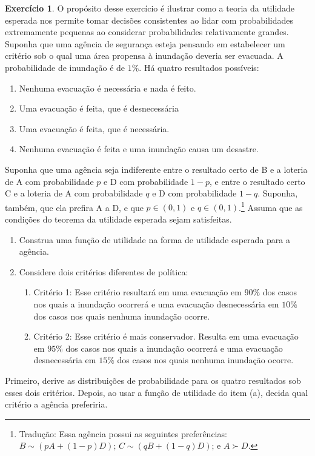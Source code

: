 \documentclass[12pt]{article}
\numberwithin{equation}{section}
\theoremstyle{plain}
\theoremstyle{definition}
\newtheorem{exercise}{Exercício}
\theoremstyle{remark}
\begin{document}
\begin{exercise}
  \parencite[exercício 6.B.4]{Mas-Colell1995} O propósito desse exercício é ilustrar como a teoria da utilidade esperada nos permite tomar decisões consistentes ao lidar com probabilidades extremamente pequenas ao considerar probabilidades relativamente grandes. Suponha que uma agência de segurança esteja pensando em estabelecer um critério sob o qual uma área propensa à inundação deveria ser evacuada. A probabilidade de inundação é de \(1\%\). Há quatro resultados possíveis:
  
  \begin{enumerate}
\def\labelenumi{(\Alph{enumi})}
\item
Nenhuma evacuação é necessária e nada é feito.
\item
Uma evacuação é feita, que é desnecessária
\item
Uma evacuação é feita, que é necessária.
\item
  Nenhuma evacuação é feita e uma inundação causa um desastre.
\end{enumerate}

Suponha que uma agência seja indiferente entre o resultado certo de B e a loteria de A com probabilidade \(p\) e D com probabilidade \(1-p\), e entre o resultado certo C e a loteria de A com probabilidade \(q\) e D com probabilidade \(1-q\). Suponha, também, que ela prefira A a D, e que \(p \in(0, 1)\) e \(q\in(0,1)\).\footnote{Tradução: Essa agência possui as seguintes preferências: \(B \sim \left(p A + (1-p) D\right)\); \(C \sim \left(q B + (1-q) D\right)\); e \(A \succ D\).} Assuma que as condições do teorema da utilidade esperada sejam satisfeitas.

\begin{enumerate}
\item
  Construa uma função de utilidade na forma de utilidade esperada para a agência.
  \item
  Considere dois critérios diferentes de política:
  
  \begin{enumerate}
  \item
  Critério 1: Esse critério resultará em uma evacuação em \(90\%\) dos casos nos quais a inundação ocorrerá e uma evacuação desnecessária em \(10\%\) dos casos nos quais nenhuma inundação ocorre.
  \item
  Critério 2: Esse critério é mais conservador. Resulta em uma evacuação em \(95\%\) dos casos nos quais a inundação ocorrerá e uma evacuação desnecessária em \(15\%\) dos casos nos quais nenhuma inundação ocorre.
\end{enumerate}
\end{enumerate}

Primeiro, derive as distribuições de probabilidade para os quatro resultados sob esses dois critérios. Depois, ao usar a função de utilidade do item (a), decida qual critério a agência preferiria.
\end{exercise}
\end{document}
